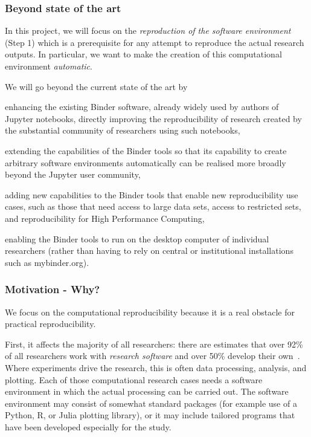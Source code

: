 \subsubsection{Beyond state of the art}

In this project, we will focus on the \emph{reproduction of the
  software environment} (Step 1) which is a prerequisite for any attempt to
reproduce the actual research outputs. In particular, we want to make the
creation of this computational environment \emph{automatic}.

We will go beyond the current state of the art by
\begin{compactitem}
\item enhancing the existing Binder software, already widely used by authors of Jupyter notebooks,
  directly improving the reproducibility of research created by the substantial
  community of researchers using such notebooks,
\item extending the capabilities of the Binder tools so that its capability to
  create arbitrary software environments automatically can be realised more broadly beyond the
  Jupyter user community,
\item adding new capabilities to the Binder tools that enable new reproducibility
  use cases, such as those that need access to large data sets, access to restricted sets,
  and reproducibility for High Performance Computing,
\item enabling the Binder tools to run on the desktop computer of individual
  researchers (rather than having to rely on central or institutional
  installations such as mybinder.org).
\end{compactitem}

\subsubsection{Motivation - Why?}

We focus on the computational reproducibility because it is a real
obstacle for practical reproducibility.

First, it affects the majority of all researchers: there are estimates that over 92\%
of all researchers work with \emph{research software} and over 50\% develop
their own~\cite{Hettrick2014}. Where experiments drive the research, this is
often data processing, analysis, and plotting. Each of those computational
research cases needs a software environment in which the actual processing can
be carried out. The software environment may consist of somewhat standard packages (for example
use of a Python, R, or Julia plotting library), or it may include tailored
programs that have been developed especially for the study.

